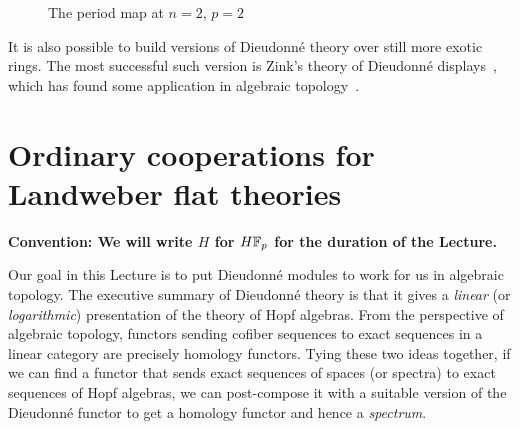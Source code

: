 \begin{figure}
\begin{center}
\end{center}
\caption{The period map at \(n = 2\), \(p = 2\)}\label{PeriodMapFigure}
\end{figure}

\begin{remark}
It is also possible to build versions of Dieudonn\'e theory over still more exotic rings.
The most successful such version is Zink's theory of Dieudonn\'e displays~\cite{ZinkDisplays}, which has found some application in algebraic topology~\cite{LawsonDisplays}.
\end{remark}









\section{Ordinary cooperations for Landweber flat theories}\label{LEFTCooperations}

\begin{center}
\textbf{Convention: We will write \(H\) for \(\HFp\) for the duration of the Lecture.}
\end{center}

Our goal in this Lecture is to put Dieudonn\'e modules to work for us in algebraic topology.
The executive summary of Dieudonn\'e theory is that it gives a \emph{linear} (or \emph{logarithmic}) presentation of the theory of Hopf algebras.
From the perspective of algebraic topology, functors sending cofiber sequences to exact sequences in a linear category are precisely homology functors.
Tying these two ideas together, if we can find a functor that sends exact sequences of spaces (or spectra) to exact sequences of Hopf algebras, we can post-compose it with a suitable version of the Dieudonn\'e functor to get a homology functor and hence a \emph{spectrum}.

